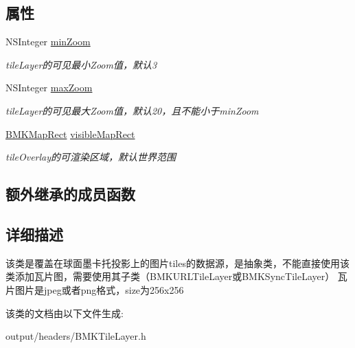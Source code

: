 \subsection*{属性}
\begin{DoxyCompactItemize}
\item 
\hypertarget{interface_b_m_k_tile_layer_a31806dcf1e35a53d50fb40f995ea87d9}{}N\+S\+Integer \hyperlink{interface_b_m_k_tile_layer_a31806dcf1e35a53d50fb40f995ea87d9}{min\+Zoom}\label{interface_b_m_k_tile_layer_a31806dcf1e35a53d50fb40f995ea87d9}

\begin{DoxyCompactList}\small\item\em tile\+Layer的可见最小\+Zoom值，默认3 \end{DoxyCompactList}\item 
\hypertarget{interface_b_m_k_tile_layer_aee6919cb7f36d34eeabf788e17e5ff81}{}N\+S\+Integer \hyperlink{interface_b_m_k_tile_layer_aee6919cb7f36d34eeabf788e17e5ff81}{max\+Zoom}\label{interface_b_m_k_tile_layer_aee6919cb7f36d34eeabf788e17e5ff81}

\begin{DoxyCompactList}\small\item\em tile\+Layer的可见最大\+Zoom值，默认20，且不能小于min\+Zoom \end{DoxyCompactList}\item 
\hypertarget{interface_b_m_k_tile_layer_ae03f9090d6e253640e22d9226714f84c}{}\hyperlink{struct_b_m_k_map_rect}{B\+M\+K\+Map\+Rect} \hyperlink{interface_b_m_k_tile_layer_ae03f9090d6e253640e22d9226714f84c}{visible\+Map\+Rect}\label{interface_b_m_k_tile_layer_ae03f9090d6e253640e22d9226714f84c}

\begin{DoxyCompactList}\small\item\em tile\+Overlay的可渲染区域，默认世界范围 \end{DoxyCompactList}\end{DoxyCompactItemize}
\subsection*{额外继承的成员函数}


\subsection{详细描述}
该类是覆盖在球面墨卡托投影上的图片tiles的数据源，是抽象类，不能直接使用该类添加瓦片图，需要使用其子类（\+B\+M\+K\+U\+R\+L\+Tile\+Layer或\+B\+M\+K\+Sync\+Tile\+Layer） 瓦片图片是jpeg或者png格式，size为256x256 

该类的文档由以下文件生成\+:\begin{DoxyCompactItemize}
\item 
output/headers/B\+M\+K\+Tile\+Layer.\+h\end{DoxyCompactItemize}
